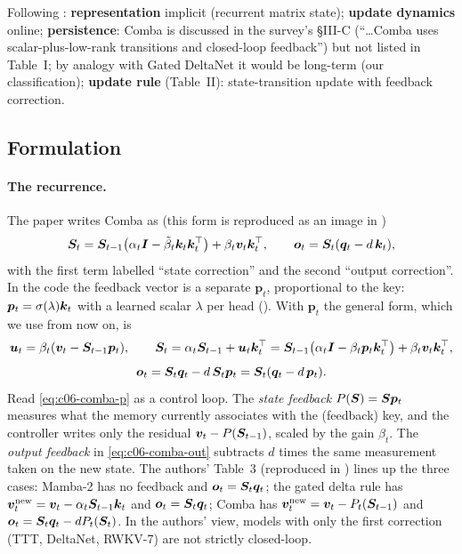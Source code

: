 \begin{taxonomy}
Following \citet{zhoubian2026memory}: \textbf{representation} implicit (recurrent matrix
state); \textbf{update dynamics} online; \textbf{persistence}: Comba is discussed in the
survey's \S III-C (``\ldots Comba uses scalar-plus-low-rank transitions and closed-loop
feedback'') but not listed in Table~I; by analogy with Gated DeltaNet it would be
long-term (our classification); \textbf{update rule} (Table~II): state-transition update
with feedback correction.
\end{taxonomy}

\subsection{Formulation}\label{sec:c06-comba-formulation}

\paragraph{The recurrence.}
The paper writes Comba as (this form is reproduced as an image in
)
\begin{equation}\label{eq:c06-comba}
  \bm{S}_t=\bm{S}_{t-1}\big(\alpha_t\bm{I}-\tilde\beta_t\bm{k}_t\bm{k}_t^{\top}\big)+\beta_t\bm{v}_t\bm{k}_t^{\top},
  \qquad
  \bm{o}_t=\bm{S}_t(\bm{q}_t-d\,\bm{k}_t),
\end{equation}
with the first term labelled ``state correction'' and the second ``output correction''. In
the code the feedback vector is a separate $\bm{p}_t$, proportional to the key:
$\bm{p}_t=\sigma(\lambda)\bm{k}_t$ with a learned scalar $\lambda$ per head (). With
$\bm{p}_t$ the general form, which we use from now on, is
\begin{equation}\label{eq:c06-comba-p}
  \bm{u}_t=\beta_t(\bm{v}_t-\bm{S}_{t-1}\bm{p}_t),\qquad
  \bm{S}_t=\alpha_t\bm{S}_{t-1}+\bm{u}_t\bm{k}_t^{\top}=\bm{S}_{t-1}\big(\alpha_t\bm{I}-\beta_t\bm{p}_t\bm{k}_t^{\top}\big)+\beta_t\bm{v}_t\bm{k}_t^{\top},
\end{equation}
\begin{equation}\label{eq:c06-comba-out}
  \bm{o}_t=\bm{S}_t\bm{q}_t-d\,\bm{S}_t\bm{p}_t=\bm{S}_t(\bm{q}_t-d\,\bm{p}_t).
\end{equation}
Read \eqref{eq:c06-comba-p} as a control loop. The \emph{state feedback}
$P(\bm{S})=\bm{S}\bm{p}_t$ measures what the memory currently associates with the (feedback) key,
and the controller writes only the residual $\bm{v}_t-P(\bm{S}_{t-1})$, scaled by the gain
$\beta_t$. The \emph{output feedback} in \eqref{eq:c06-comba-out} subtracts $d$ times the
same measurement taken on the new state. The authors' Table~3 (reproduced in
) lines up the three
cases: Mamba-2 has no feedback and $\bm{o}_t=\bm{S}_t\bm{q}_t$; the gated delta rule has
$\bm{v}_t^{\text{new}}=\bm{v}_t-\alpha_t\bm{S}_{t-1}\bm{k}_t$ and $\bm{o}_t=\bm{S}_t\bm{q}_t$; Comba has
$\bm{v}_t^{\text{new}}=\bm{v}_t-P_t(\bm{S}_{t-1})$ and $\bm{o}_t=\bm{S}_t\bm{q}_t-dP_t(\bm{S}_t)$. In the
authors' view, models with only the first correction (TTT, DeltaNet, RWKV-7) are not
strictly closed-loop.

